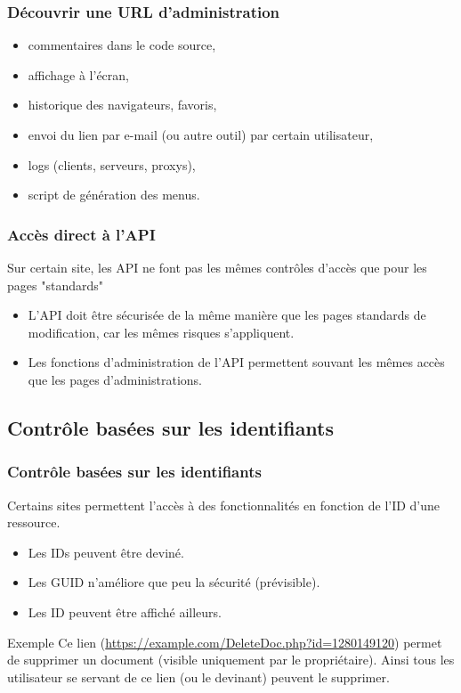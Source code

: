 \documentclass{beamer}
\begin{document}
\begin{frame}
  \frametitle{Découvrir une URL d'administration}
  \begin{itemize}
    \item commentaires dans le code source,
    \item affichage à l'écran, 
    \item historique des navigateurs, favoris,
    \item envoi du lien par e-mail (ou autre outil) par certain utilisateur,
    \item logs (clients, serveurs, proxys), 
    \item script de génération des menus.
  \end{itemize}
\end{frame}

\begin{frame}
  \frametitle{Accès direct à l'API}
  Sur certain site, les API ne font pas les mêmes contrôles d'accès que pour les pages "standards"
  \vspace{2em}
  \begin{itemize}
    \item L'API doit être sécurisée de la même manière que les pages standards de modification, car les mêmes risques s'appliquent.
    \item Les fonctions d'administration de l'API permettent souvant les mêmes accès que les pages d'administrations.
  \end{itemize}
\end{frame}

\subsection{Contrôle basées sur les identifiants}
\begin{frame}
  \frametitle{Contrôle basées sur les identifiants}
  \label{fram:vuln-fn-id-based}
  Certains sites permettent l'accès à des fonctionnalités en fonction de l'ID d'une ressource.
  \begin{itemize}
    \item Les IDs peuvent être deviné.
    \item Les GUID n'améliore que peu la sécurité (prévisible).
    \item Les ID peuvent être affiché ailleurs.
  \end{itemize}
  \begin{block}{Exemple}
    Ce lien (\url{https://example.com/DeleteDoc.php?id=1280149120}) permet de supprimer un document (visible uniquement par le propriétaire). Ainsi tous les utilisateur se servant de ce lien (ou le devinant) peuvent le supprimer.
  \end{block}
\end{frame}
\end{document}
